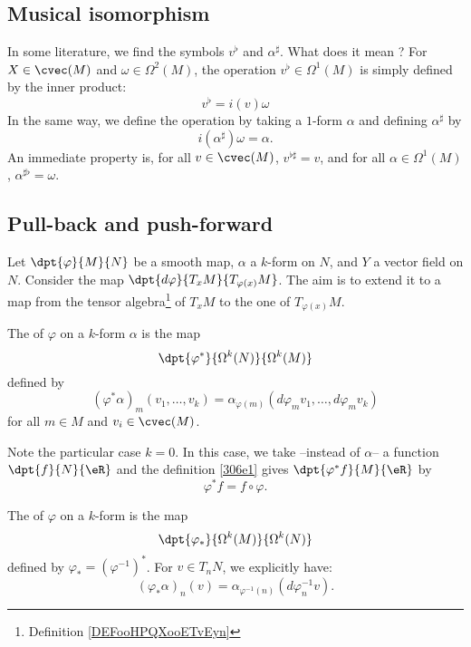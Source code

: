 \subsection{Musical isomorphism}\label{subsec_musique}

In some literature, we find the symbols $v^{\flat}$ and $\alpha^{\sharp}$. What does it mean ? For $X\in\cvec(M)$ and $\omega\in\Omega^2(M)$, the  operation $v^{\flat}\in\Omega^1(M)$ is simply defined by the inner product:
\begin{equation}        \label{EQooBTWXooTqoNxa}
	v^{\flat}=i(v)\omega
\end{equation}
In the same way, we define the  operation by taking a $1$-form $\alpha$ and defining $\alpha^{\sharp}$ by
\begin{equation}
	i(\alpha^{\sharp})\omega=\alpha.
\end{equation}
An immediate property is, for all $v\in\cvec(M)$, $v^{\flat\sharp}=v$, and for all $\alpha\in\Omega^1(M)$, $\alpha^{\sharp\flat}=\omega$.

\subsection{Pull-back and push-forward}

\begin{normaltext}
	Let $\dpt{\varphi}{M}{N}$ be a smooth map, $\alpha$ a $k$-form on $N$, and $Y$ a vector field on $N$. Consider the map $\dpt{d\varphi}{T_xM}{T_{\varphi(x)}M}$. The aim is to extend it to a map from the tensor algebra\footnote{Definition \ref{DEFooHPQXooETvEyn}} of ${T_xM}$ to the one of $T_{\varphi(x)}M$.
\end{normaltext}

The  of $\varphi$ on a $k$-form $\alpha$ is the map
\[
	\dpt{\varphi^*}{\Omega^k(N)}{\Omega^k(M)}
\]
defined by
\begin{equation}\label{306e1}
	(\varphi^*\alpha)_m(v_1,\ldots,v_k)
	=\alpha_{\varphi(m)}(d\varphi_mv_1,\ldots,d\varphi_mv_k)
\end{equation}
for all $m\in M$ and $v_i\in\cvec(M)$.

Note the particular case $k=0$. In this case, we take --instead of $\alpha$-- a function $\dpt{f}{N}{\eR}$ and the definition \eqref{306e1} gives $\dpt{\varphi^*f}{M}{\eR}$ by
\[
	\varphi^*f=f\circ\varphi.
\]

The  of $\varphi$ on a $k$-form is the map
\[
	\dpt{\varphi_*}{\Omega^k(M)}{\Omega^k(N)}
\]
defined by $\varphi_*=(\varphi^{-1})^*$. For $v\in T_nN$, we explicitly have:
\[
	(\varphi_*\alpha)_n(v)=\alpha_{\varphi^{-1}(n)}(d\varphi_n^{-1} v).
\]

